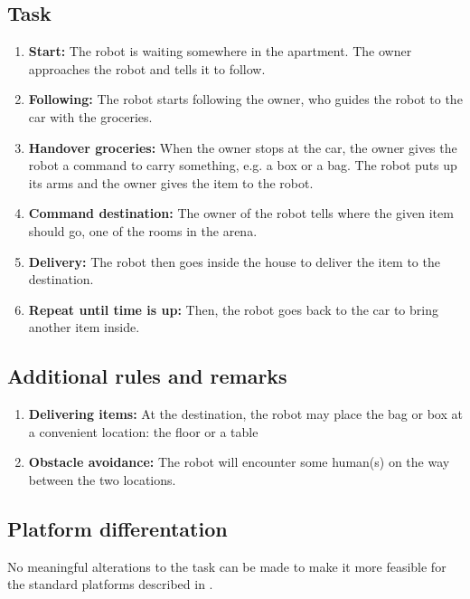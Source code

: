 \subsection{Task}
\begin{enumerate}
\item \textbf{Start:} The robot is waiting somewhere in the apartment. The owner approaches the robot and tells it to follow.
\item \textbf{Following:} The robot starts following the owner, who guides the robot to the car with the groceries. 
\item \textbf{Handover groceries:} When the owner stops at the car, the owner gives the robot a command to carry something, e.g. a box or a bag.  The robot puts up its arms and the owner gives the item to the robot.
\item \textbf{Command destination:} The owner of the robot tells where the given item should go, one of the rooms in the arena. 
\item \textbf{Delivery:} The robot then goes inside the house to deliver the item to the destination. 
\item \textbf{Repeat until time is up:} Then, the robot goes back to the car to bring another item inside. 
\end{enumerate}

\subsection{Additional rules and remarks}
\begin{enumerate}
  \item \textbf{Delivering items:} At the destination, the robot may place the bag or box at a convenient location: the floor or a table
  \item \textbf{Obstacle avoidance:} The robot will encounter some human(s) on the way between the two locations.  
\end{enumerate}

\subsection{Platform differentation}
No meaningful alterations to the task can be made to make it more feasible for the standard platforms described in . 

